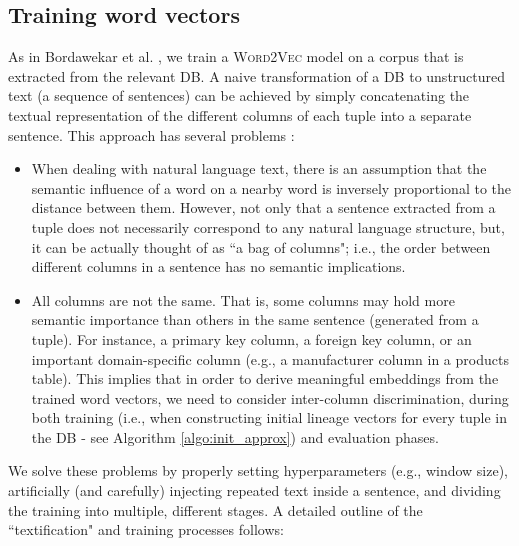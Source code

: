 \subsection{Training word vectors} 
As in Bordawekar et al. \cite{DBLP:journals/corr/BordawekarS16}, we train a \textsc{Word2Vec} model \cite{rehurek_lrec} on a corpus that is extracted from the relevant DB.
A naive transformation of a DB to unstructured text (a sequence of sentences) can be achieved by simply concatenating the textual representation of the different columns of each tuple into a separate sentence. This approach has several problems \cite{DBLP:journals/corr/BordawekarS16}:
\begin{itemize}
    \item When dealing with natural language text, there is an assumption that the semantic influence of a word on a nearby word is inversely proportional to the distance between them. However, not only that a sentence extracted from a tuple does not necessarily correspond to any natural language structure, but, it can be actually thought of as ``a bag of columns"; i.e., the order between different columns in a sentence has no semantic implications.
    \item All columns are not the same. That is, some columns may hold more semantic importance than others in the same sentence (generated from a tuple). For instance, a primary key column, a foreign key column, or an important domain-specific column (e.g., a manufacturer column in a products table). This implies that in order to derive meaningful embeddings from the trained word vectors, we need to consider inter-column discrimination, during both training (i.e., when constructing initial lineage vectors for every tuple in the DB - see Algorithm \ref{algo:init_approx}) and evaluation phases.
\end{itemize}
We solve these problems by properly setting hyperparameters (e.g., window size), artificially (and carefully) injecting repeated text inside a sentence, and dividing the training into multiple, different stages. 
A detailed outline of the ``textification" and training processes follows:

